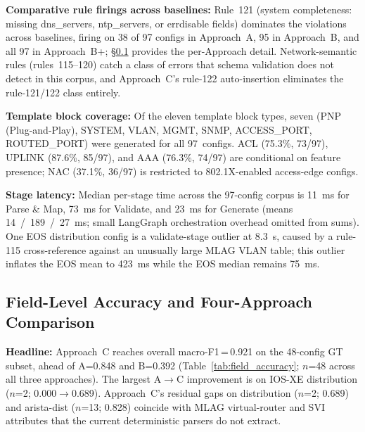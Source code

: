 \documentclass[conference]{IEEEtran}
\begin{document}
\textbf{Comparative rule firings across baselines:} Rule~121 (system completeness: missing dns\_servers, ntp\_servers, or errdisable fields) dominates the violations across baselines, firing on 38 of 97 configs in Approach~A, 95 in Approach~B, and all 97 in Approach~B+; §\ref{sec:field_accuracy} provides the per-Approach detail. Network-semantic rules (rules~115--120) catch a class of errors that schema validation does not detect in this corpus, and Approach~C's rule-122 auto-insertion eliminates the rule-121/122 class entirely.

\textbf{Template block coverage:} Of the eleven template block types, seven (PNP (Plug-and-Play), SYSTEM, VLAN, MGMT, SNMP, ACCESS\_PORT, ROUTED\_PORT) were generated for all 97~configs. ACL (75.3\%, 73/97), UPLINK (87.6\%, 85/97), and AAA (76.3\%, 74/97) are conditional on feature presence; NAC (37.1\%, 36/97) is restricted to 802.1X-enabled access-edge configs.

\textbf{Stage latency:} Median per-stage time across the 97-config corpus is 11~ms for Parse \& Map, 73~ms for Validate, and 23~ms for Generate (means 14~/~189~/~27~ms; small LangGraph orchestration overhead omitted from sums). One EOS distribution config is a validate-stage outlier at 8.3~s, caused by a rule-115 cross-reference against an unusually large MLAG VLAN table; this outlier inflates the EOS mean to 423~ms while the EOS median remains 75~ms.

\subsection{Field-Level Accuracy and Four-Approach Comparison}
\label{sec:field_accuracy}

\textbf{Headline:} Approach~C reaches overall macro-F1\,=\,0.921 on the 48-config GT subset, ahead of A=0.848 and B=0.392 (Table~\ref{tab:field_accuracy}; $n$=48 across all three approaches). The largest A$\to$C improvement is on IOS-XE distribution ($n$=2; 0.000$\to$0.689). Approach~C's residual gaps on distribution ($n$=2; 0.689) and arista-dist ($n$=13; 0.828) coincide with MLAG virtual-router and SVI attributes that the current deterministic parsers do not extract.
\end{document}
